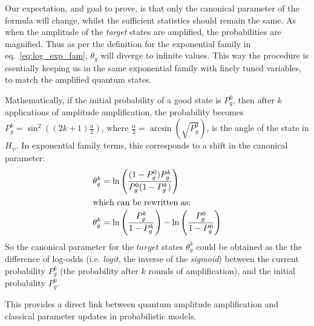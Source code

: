 \documentclass[encoding=utf8,british]{tumphthesis}
\begin{document}
        Our expectation, and goal to prove, is that only the canonical parameter of the formula will change, whilst the sufficient statistics should remain
        the same. As when the amplitude of the \textit{target} states are amplified, the probabilities are magnified. Thus as per the definition
        for the exponential family in eq.~\ref{eq:log_exp_fam}, $\theta_g$ will diverge to infinite values. This way the procedure is esentially keeping us in 
        the same exponential family with finely tuned variables, to match the amplified quantum states.
        
        Mathematically, if the initial probability of a good state is $P_{g}^0$, then after $k$ applications of amplitude amplification, the probability becomes $P_g^k = \sin^2\left((2k+1)\frac{\alpha}{2}\right)$, 
        where $\frac{\alpha}{2} = \arcsin(\sqrt{P_{g}^0})$, is the angle of the state in $H_{\psi}$. In exponential family terms, this corresponds to a shift in the canonical parameter:
        \begin{align}
            \theta_g^k &= \ln\left(\frac{(1-P_{g}^0)P_g^k}{P_{g}^0(1-P_g^k)}\right) \\
            \intertext{which can be rewritten as:}
            \theta_g^k &= \ln \left( \frac{P_g^k}{1 - P_g^k} \right) - \ln \left( \frac{P_{g}^0}{1 - P_{g}^0} \right)
            \label{eq:Can_par_change}
        \end{align}
        So the canonical parameter for the $target$ states $\theta_g^k$ could be obtained as the the difference of log-odds (i.e. \textit{logit}, the inverse of the \textit{sigmoid}) between the current probability $P_g^k$ (the probability after $k$ rounds of amplification),
        and the initial probability $P_{g}^0$.

        This provides a direct link between quantum amplitude amplification and classical parameter updates in probabilistic models.

\end{document}

